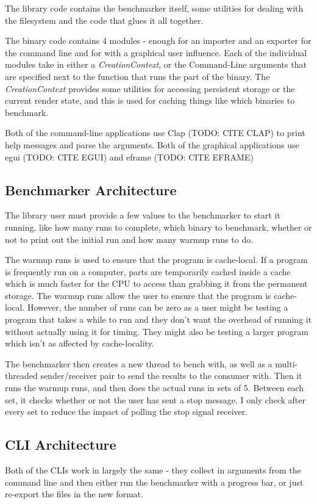 \documentclass{article}
\begin{document}
The library code contains the benchmarker itself, some utilities for dealing with the filesystem and the code that glues it all together.

The binary code contains 4 modules - enough for an importer and an exporter for the command line and for with a graphical user influence. Each of the individual modules take in either a \textit{CreationContext}, or the Command-Line arguments that are specified next to the function that runs the part of the binary. The \textit{CreationContext} provides some utilities for accessing persistent storage or the current render state, and this is used for caching things like which binaries to benchmark.

Both of the command-line applications use Clap (TODO: CITE CLAP) to print help messages and parse the arguments. Both of the graphical applications use egui (TODO: CITE EGUI) and eframe (TODO: CITE EFRAME)

\subsection{Benchmarker Architecture}
The library user must provide a few values to the benchmarker to start it running, like how many runs to complete, which binary to benchmark, whether or not to print out the initial run and how many warmup runs to do.

The warmup runs is used to ensure that the program is cache-local. If a program is frequently run on a computer, parts are temporarily cached inside a cache which is much faster for the CPU to access than grabbing it from the permanent storage. The warmup runs allow the user to ensure that the program is cache-local. However, the number of runs can be zero as a user might be testing a program that takes a while to run and they don't want the overhead of running it without actually using it for timing. They might also be testing a larger program which isn't as affected by cache-locality.

The benchmarker then creates a new thread to bench with, as well as a multi-threaded sender/receiver pair to send the results to the consumer with. Then it runs the warmup runs, and then does the actual runs in sets of 5. Between each set, it checks whether or not the user has sent a stop message. I only check after every set to reduce the impact of polling the stop signal receiver.

\subsection{CLI Architecture}
Both of the CLIs work in largely the same - they collect in arguments from the command line and then either run the benchmarker with a progress bar, or just re-export the files in the new format.
\end{document}
